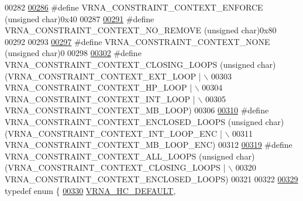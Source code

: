\begin{DoxyCode}
00282 
\hyperlink{constraints__hard_8h_a1aa55f2c6347e670e003b1a765632dad}{00286} \textcolor{preprocessor}{#define VRNA\_CONSTRAINT\_CONTEXT\_ENFORCE       (unsigned char)0x40}
00287 
\hyperlink{constraints__hard_8h_a9fcac36535850ff612c7e6b1305304a1}{00291} \textcolor{preprocessor}{#define VRNA\_CONSTRAINT\_CONTEXT\_NO\_REMOVE     (unsigned char)0x80}
00292 
00293 
\hyperlink{constraints__hard_8h_addb99fd07ad9acc0201fd07eada8f661}{00297} \textcolor{preprocessor}{#define VRNA\_CONSTRAINT\_CONTEXT\_NONE          (unsigned char)0}
00298 
\hyperlink{constraints__hard_8h_a10675929fdc14c5f81df49d77933067a}{00302} \textcolor{preprocessor}{#define VRNA\_CONSTRAINT\_CONTEXT\_CLOSING\_LOOPS (unsigned char)(VRNA\_CONSTRAINT\_CONTEXT\_EXT\_LOOP | \(\backslash\)}
00303 \textcolor{preprocessor}{                                                              VRNA\_CONSTRAINT\_CONTEXT\_HP\_LOOP | \(\backslash\)}
00304 \textcolor{preprocessor}{                                                              VRNA\_CONSTRAINT\_CONTEXT\_INT\_LOOP | \(\backslash\)}
00305 \textcolor{preprocessor}{                                                              VRNA\_CONSTRAINT\_CONTEXT\_MB\_LOOP)}
00306 
\hyperlink{constraints__hard_8h_ae03ed6ba25cf3cefdf36516e4081eb17}{00310} \textcolor{preprocessor}{#define VRNA\_CONSTRAINT\_CONTEXT\_ENCLOSED\_LOOPS  (unsigned char)(VRNA\_CONSTRAINT\_CONTEXT\_INT\_LOOP\_ENC | \(\backslash\)}
00311 \textcolor{preprocessor}{                                                                VRNA\_CONSTRAINT\_CONTEXT\_MB\_LOOP\_ENC)}
00312 
\hyperlink{group__hard__constraints_ga886d9127c49bb982a4b67cd7581e8a5a}{00319} \textcolor{preprocessor}{#define VRNA\_CONSTRAINT\_CONTEXT\_ALL\_LOOPS     (unsigned char)(VRNA\_CONSTRAINT\_CONTEXT\_CLOSING\_LOOPS | \(\backslash\)}
00320 \textcolor{preprocessor}{                                                              VRNA\_CONSTRAINT\_CONTEXT\_ENCLOSED\_LOOPS)}
00321 
00322 
\hyperlink{constraints__hard_8h_a0fcb8bda9b3712e14f8f513def112435}{00329} \textcolor{keyword}{typedef} \textcolor{keyword}{enum} \{
\hyperlink{constraints__hard_8h_a0fcb8bda9b3712e14f8f513def112435a030a42722f849b10dd5780ceed7dfedd}{00330}   \hyperlink{constraints__hard_8h_a0fcb8bda9b3712e14f8f513def112435a030a42722f849b10dd5780ceed7dfedd}{VRNA\_HC\_DEFAULT},  

\end{DoxyCode}
